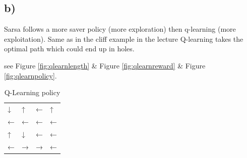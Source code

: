 \documentclass[a4paper]{article}
\begin{document}
\newpage
\subsection*{b)}

Sarsa follows a more saver policy (more exploration) then q-learning (more exploitation). Same as in the cliff example in the lecture Q-learning takes the optimal path which could end up in holes.

see Figure \ref{fig:qlearnlength} \& Figure \ref{fig:qlearnreward} \& Figure \ref{fig:qlearnpolicy}.

\begin{table}[!ht]
	\centering
	\begin{tabular}{llll}
		↓ & ↑ & ← & ↑ \\
		← & ← & ← & ← \\
		↑ & ↓ & ← & ← \\
		← & → & → & ←
	\end{tabular}
	\caption{Q-Learning policy}
\end{table}
\end{document}
